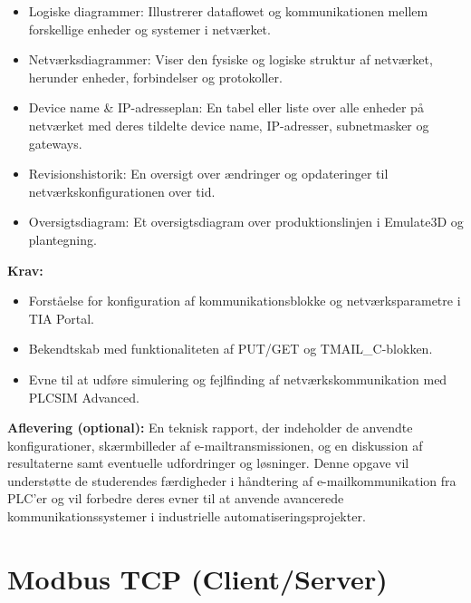 \begin{enumerate}
\begin{itemize}
		\item Logiske diagrammer: Illustrerer dataflowet og kommunikationen mellem forskellige enheder og systemer i netværket.
		\item Netværksdiagrammer: Viser den fysiske og logiske struktur af netværket, herunder enheder, forbindelser og protokoller.
		\item Device name \& IP-adresseplan: En tabel eller liste over alle enheder på netværket med deres tildelte device name, IP-adresser, subnetmasker og gateways.
		\item Revisionshistorik: En oversigt over ændringer og opdateringer til netværkskonfigurationen over tid.
		\item Oversigtsdiagram: Et oversigtsdiagram over produktionslinjen i Emulate3D og plantegning.
	\end{itemize}
\end{enumerate}

\textbf{Krav:}
\begin{itemize}
	\item Forståelse for konfiguration af kommunikationsblokke og netværksparametre i TIA Portal.
	\item Bekendtskab med funktionaliteten af PUT/GET og TMAIL\_C-blokken.
	\item Evne til at udføre simulering og fejlfinding af netværkskommunikation med PLCSIM Advanced.
\end{itemize}

\noindent\textbf{Aflevering (optional):} En teknisk rapport, der indeholder de anvendte konfigurationer, skærmbilleder af e-mailtransmissionen, og en diskussion af resultaterne samt eventuelle udfordringer og løsninger.
\newline\newline
\noindent Denne opgave vil understøtte de studerendes færdigheder i håndtering af e-mailkommunikation fra PLC'er og vil forbedre deres evner til at anvende avancerede kommunikationssystemer i industrielle automatiseringsprojekter.

\section{Modbus TCP (Client/Server)}
\label{subsec:modbus_tcp_client_server_knapper_analog}

